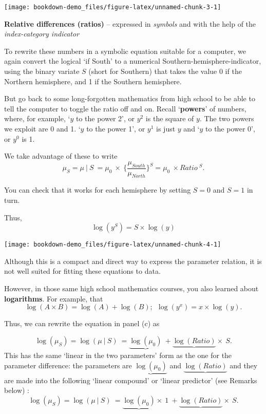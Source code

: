 \documentclass[]{book}
\begin{document}
\begin{center}\texttt{[image: bookdown-demo\_files/figure-latex/unnamed-chunk-3-1]} \end{center}

\textbf{Relative differences (ratios)} -- expressed in \emph{symbols} and with the help of the \emph{index-category indicator}

To rewrite these numbers in a symbolic equation suitable for a computer, we again convert the logical `if South' to a numerical Southern-hemisphere-indicator, using the binary variate \(S\) (short for Southern) that takes the value 0 if the Northern hemisphere, and 1 if the Southern hemisphere.

But go back to some long-forgotten mathematics from high school to be able to tell the computer to toggle the ratio off and on. Recall `\textbf{powers}' of numbers, where, for example,
`\(y\) to the power 2', or \(y^2\) is the square of \(y\). The two powers we exploit are 0 and 1.
`\(y\) to the power 1', or \(y^1\) is just \(y\) and `\(y\) to the power 0', or \(y^0\) is 1.

We take advantage of these to write
\[\mu_S = \mu \ | \ S  \ = \mu_0 \ \times \  \Big\{ \frac{\mu_{South}}{\mu_{North}}\Big\}^S = \mu_0 \ \times Ratio \ ^ S.\]

You can check that it works for each hemisphere by setting \(S=0\) and \(S=1\) in turn.

Thus, \[\log(y^S) = S \times \log(y)\]

\begin{center}\texttt{[image: bookdown-demo\_files/figure-latex/unnamed-chunk-4-1]} \end{center}

Although this is a compact and direct way to express the
parameter relation, it is not well suited for fitting these equations to data.

However, in those same high school mathematics courses, you also learned about \textbf{logarithms}. For example, that
\[\log(A \times B) = \log(A) + \log(B); \ \  \log(y^x) = x \times \log(y).\]

Thus, we can rewrite the equation in panel (c) as

\[\log(\mu_S) = \log(\mu \ | \ S)  \ = \underbrace{\log(\mu_0)} \ +  \underbrace{\log(Ratio)} \times \ S.\]
This has the same `linear in the two parameters' form as the one for the parameter difference: the parameters are
\(\underbrace{\log(\mu_0)}\) and \(\underbrace{\log(Ratio)}\) and they are made into the following `linear compound' or `linear predictor' (see Remarks below) :
\[\log(\mu_S) = \log(\mu \ | \ S)  \ = \underbrace{\log(\mu_0)} \times \ 1 \ + \underbrace{\log(Ratio)} \times \ S.\]
\end{document}
